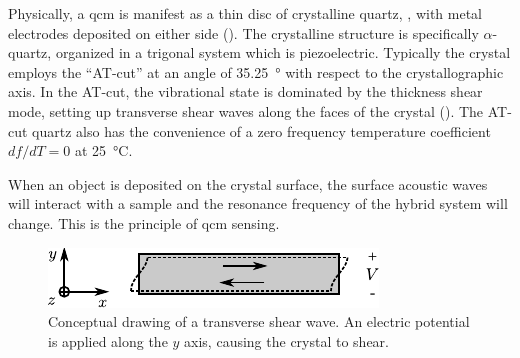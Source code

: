 Physically, a \gls{qcm} is manifest as a thin disc of crystalline quartz,
, with metal electrodes deposited on either side
().  The crystalline structure is specifically
$\alpha$-quartz, organized in a trigonal system which is piezoelectric.
Typically the crystal employs the ``AT-cut'' at an angle of
\SI{35.25}{\degree} with respect to the crystallographic axis.  In the
AT-cut, the vibrational state is dominated by the thickness shear mode,
setting up transverse shear waves along the faces of the crystal
().  The AT-cut quartz also has the convenience of
a zero frequency temperature coefficient $df/dT=0$ at \SI{25}{\celsius}.

When an object is deposited on the crystal surface, the surface acoustic
waves will interact with a sample and the resonance frequency of the hybrid
system will change.  This is the principle of \gls{qcm} sensing.
\begin{figure}[t]
  \centering
  \includegraphics[keepaspectratio]{qcm/figures/qcm_shearmode.pdf}
  \caption{Conceptual drawing of a transverse shear wave.  An electric
    potential is applied along the $y$ axis, causing the crystal to
    shear.}
  \label{fig:qcmshearwave}
\end{figure}
